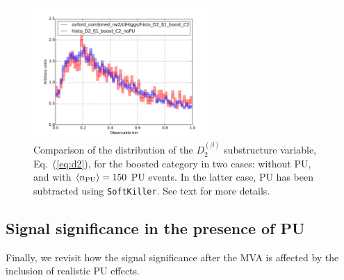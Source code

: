 \begin{figure}[t]
  \begin{center}
      \vspace{-1cm}
  \includegraphics[width=0.60\textwidth]{plots/pu-vs-nopu-comparison-d2.pdf}
  \caption{\small
    Comparison of the distribution of the $D_2^{(\beta)}$
    substructure variable, Eq.~(\ref{eq:d2}), for the
    boosted category in two cases: without PU, and
    with $\left\langle n_{\rm PU}\right\rangle=150$ PU events.
    In the latter case, PU has been subtracted using
    {\tt SoftKiller}.
    See text for more details.
}
\label{fig: pu-vs-nopu-comparison-d2}
\end{center}
\end{figure}

\subsection{Signal significance in the presence of PU}

Finally, we revisit how the signal significance after the MVA
is affected by the inclusion of realistic PU effects.

